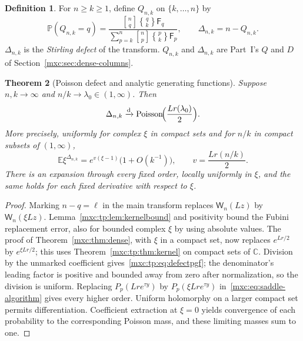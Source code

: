 \documentclass[11pt]{article}
\numberwithin{equation}{section}
\newtheorem{theorem}{Theorem}[section]
\theoremstyle{definition}
\newtheorem{definition}[theorem]{Definition}
\theoremstyle{remark}
\newcommand{\E}{\mathbb E}
\newcommand{\Pp}{\mathbb P}
\newcommand{\StirOne}[2]{\genfrac{[}{]}{0pt}{}{#1}{#2}}
\newcommand{\StirTwo}[2]{\genfrac{\{} {\}}{0pt}{}{#1}{#2}}
\DeclareMathOperator{\Pois}{Poisson}
\begin{document}
\begin{definition}\label{mxc:tp:def:defect}
For $n\ge k\ge1$, define $Q_{n,k}$ on $\{k,\ldots,n\}$ by
\begin{equation}\label{mxc:tp:eq:defectdef}
 \Pp(Q_{n,k}=q)=\frac{\StirOne nq\StirTwo qk\mathsf F_q}
 {\sum_{p=k}^n\StirOne np\StirTwo pk\mathsf F_p},
 \qquad \Delta_{n,k}=n-Q_{n,k}.
\end{equation}
$\Delta_{n,k}$ is the \emph{Stirling defect} of the transform. $Q_{n,k}$
and $\Delta_{n,k}$ are Part~I's $Q$ and $D$ of
Section~\ref{mxc:sec:dense-columns}.
\end{definition}

\begin{theorem}[Poisson defect and analytic generating functions]\label{mxc:tp:thm:defect}
Suppose $n,k\to\infty$ and $n/k\to\lambda_0\in(1,\infty)$. Then
\begin{equation}\label{mxc:tp:eq:defectlimit}
 \Delta_{n,k}\xrightarrow{\mathrm d}\Pois\!\Bigl(\frac{Lr(\lambda_0)}2\Bigr).
\end{equation}
More precisely, uniformly for complex $\xi$ in compact sets and for $n/k$
in compact subsets of $(1,\infty)$,
\begin{equation}\label{mxc:tp:eq:defectpgf}
 \E\xi^{\Delta_{n,k}}=e^{v(\xi-1)}\bigl(1+O(k^{-1})\bigr),
 \qquad v=\frac{Lr(n/k)}2.
\end{equation}
There is an expansion through every fixed order, locally uniformly in
$\xi$, and the same holds for each fixed derivative with respect to
$\xi$.
\end{theorem}
\begin{proof}
Marking $n-q=\ell$ in the main transform replaces $\mathsf W_n(Lz)$ by
$\mathsf W_n(\xi Lz)$. Lemma~\ref{mxc:tp:lem:kernelbound} and positivity
bound the Fubini replacement error, also for bounded complex $\xi$ by
using absolute values. The proof of Theorem~\ref{mxc:thm:dense}, with $\xi$
in a compact set, now replaces $e^{Lr/2}$ by $e^{\xi Lr/2}$; this uses
Theorem~\ref{mxc:tp:thm:kernel} on compact sets of $\mathbb C$. Division by
the unmarked coefficient gives~\eqref{mxc:tp:eq:defectpgf}; the
denominator's leading factor is positive and bounded away from zero after
normalization, so the division is uniform. Replacing $P_p(Lre^{\tau y})$
by $P_p(\xi Lre^{\tau y})$ in~\eqref{mxc:eq:saddle-algorithm} gives every
higher order. Uniform holomorphy on a larger compact set permits
differentiation. Coefficient extraction at $\xi=0$ yields convergence of
each probability to the corresponding Poisson mass, and these limiting
masses sum to one.
\end{proof}
\end{document}
